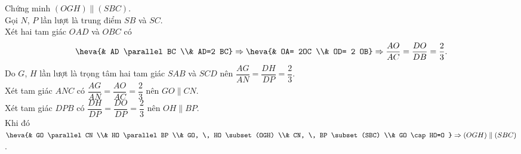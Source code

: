 \begin{bt}
{\begin{listEX}
{\begin{tikzpicture}[line join=round,line cap=round,line width=.6pt,font=\footnotesize,scale=.9]
\end{tikzpicture}}
\item Chứng minh $(OGH) \parallel (SBC)$.\\
Gọi $N$, $P$ lần lượt là trung điểm $SB$ và $SC$.
\\ Xét hai tam giác $OAD$ và $OBC$ có $$\heva{& AD \parallel BC \\& AD=2 BC} \Rightarrow \heva{& OA= 2OC \\& OD= 2 OB} \Rightarrow  \dfrac{AO}{AC}=\dfrac{DO}{DB}=\dfrac{2}{3}.$$
Do $G$, $H$ lần lượt là trọng tâm hai tam giác $SAB$ và $SCD$ nên $\dfrac{AG}{AN}=\dfrac{DH}{DP}=\dfrac{2}{3}$.\\
Xét tam giác $ANC$ có $\dfrac{AG}{AN}=\dfrac{AO}{AC}=\dfrac{2}{3}$ nên $GO \parallel CN$.\\
Xét tam giác $DPB$ có $\dfrac{DH}{DP}=\dfrac{DO}{DP}=\dfrac{2}{3}$ nên $OH \parallel BP$.\\
Khi đó $\heva{& GO \parallel CN \\& HO \parallel BP \\& GO, \, HO \subset (OGH) \\& CN, \, BP \subset (SBC) \\& GO \cap HO=O } \Rightarrow (OGH)\parallel (SBC)$.
\end{listEX}}
\end{bt}


